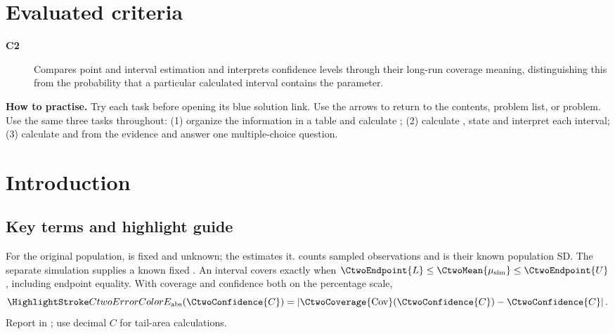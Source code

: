 \maketitle

\setcounter{tocdepth}{1}
\setcounter{secnumdepth}{2}
\label{toc}
\tableofcontents

\section*{Evaluated criteria}
\begin{description}
    \item[\textbf{C2}] Compares point and interval estimation and interprets confidence levels through their long-run coverage meaning, distinguishing this from the probability that a particular calculated interval contains the parameter.
\end{description}

\textbf{How to practise.} Try each task before opening its blue solution link. Use the arrows to return to the contents, problem list, or problem. Use the same three tasks throughout: (1) organize the information in a table and calculate ; (2) calculate , state and interpret each interval; (3) calculate  and  from the evidence and answer one multiple-choice question.

\clearpage
\section{Introduction}
\label{sec:introduction}

\noindent\begin{minipage}{\linewidth}
\subsection{Key terms and highlight guide}
\label{subsec:c2-key-terms}
\label{tab:highlight-legend}
For the original population, \CtwoMean{$\mu$} is fixed and unknown; the
  estimates it.
 counts sampled observations and \CtwoSD{$\sigma$} is their known population SD.
The separate simulation supplies a known fixed .
An interval covers exactly when $\CtwoEndpoint{L}\leq\CtwoMean{\mu_{\rm sim}}\leq\CtwoEndpoint{U}$,
including endpoint equality. With coverage and confidence both on the percentage scale,
\[
\CtwoError{E_{\rm abs}}(\CtwoConfidence{C})
=\left|\CtwoCoverage{\mathrm{Cov}}(\CtwoConfidence{C})-\CtwoConfidence{C}\right|.
\]
Report  in ; use decimal $C$ for tail-area calculations.

\end{minipage}\par

